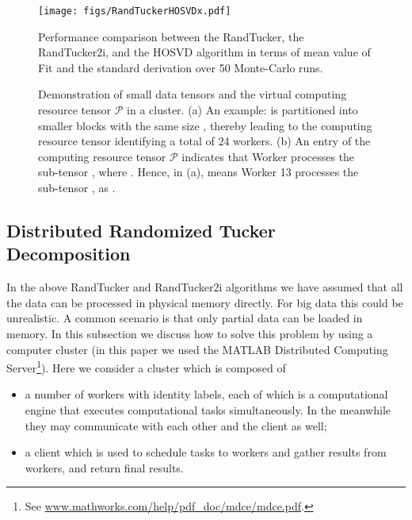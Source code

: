\documentclass[10pt,twocolumn,twoside]{IEEEtran}
\newcommand{\tensor}[1]{\ensuremath{\boldsymbol{\mathscr{#1}}}}
\begin{document}
\begin{figure}[!t]
\centerline{
\texttt{[image: figs/RandTuckerHOSVDx.pdf]}
}
\caption{Performance comparison between the RandTucker, the RandTucker2i, and the HOSVD algorithm in terms of mean value of Fit and the standard derivation over 50 Monte-Carlo runs.}
\label{fig:rtuckerhosvd}
\end{figure}


 \begin{figure*}[!t]
    \centerline{
     \hfill
    }
    \caption{ Demonstration of small data tensors and the virtual computing resource tensor \tensor{P} in a cluster. 
    (a) An example:  is partitioned into smaller blocks  with the same size , thereby leading to the  computing resource tensor  identifying a total of 24 workers. 
    (b) An entry  of the computing resource tensor \tensor{P} indicates that Worker  processes the sub-tensor , where .   Hence,  in (a),  means Worker 13 processes the sub-tensor , as .
    }
    \label{fig:PartionOfTensor}
  \end{figure*}
\subsection{Distributed Randomized Tucker Decomposition}
\label{sec:DisTucker}
In the above RandTucker and RandTucker2i algorithms we have assumed that all the data can be processed in physical memory directly. For big data this could be unrealistic. A common scenario is that only partial data can be loaded in memory. In this subsection we discuss how to solve this problem  by using a computer cluster (in this paper we used the MATLAB Distributed Computing Server\footnote{See \url{www.mathworks.com/help/pdf_doc/mdce/mdce.pdf}.}). Here we consider a cluster which is composed of
\begin{itemize}
\item a number of workers with identity labels, each of which is a computational engine that executes computational tasks simultaneously. In the meanwhile they may communicate with each other and  the client as well;

\item a client which is used to schedule tasks to workers and gather results from workers, and return final results.
\end{itemize}
\end{document}
